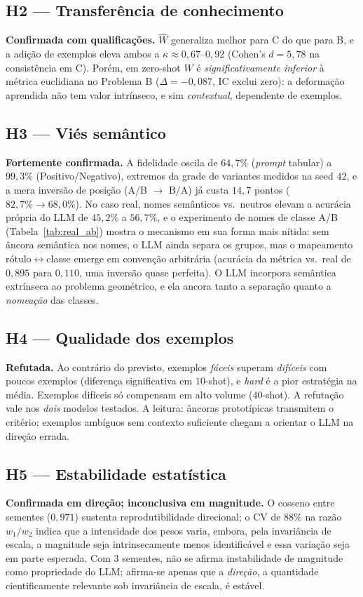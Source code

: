 \documentclass[12pt,a4paper]{article}
\newcommand{\West}{\ensuremath{\hat{W}}}   %
\begin{document}
\subsection{H2 — Transferência de conhecimento}
\textbf{Confirmada com qualificações.} \West{} generaliza melhor para C do que para B, e a
adição de exemplos eleva ambos a $\kappa \approx 0{,}67$–$0{,}92$ (Cohen's $d = 5{,}78$ na
consistência em C). Porém, em zero-shot \West{} é \emph{significativamente inferior} à
métrica euclidiana no Problema B ($\Delta = -0{,}087$, IC exclui zero): a deformação
aprendida não tem valor intrínseco, e sim \emph{contextual}, dependente de exemplos.

\subsection{H3 — Viés semântico}
\textbf{Fortemente confirmada.} A fidelidade oscila de $64{,}7\%$ (\emph{prompt} tabular) a
$99{,}3\%$ (Positivo/Negativo), extremos da grade de variantes medidos na seed $42$, e a
mera inversão de posição (A/B $\to$ B/A) já custa $14{,}7$ pontos ($82{,}7\% \to 68{,}0\%$).
No caso real, nomes semânticos vs.\ neutros elevam a acurácia própria do LLM de $45{,}2\%$ a
$56{,}7\%$, e o experimento de nomes de classe A/B (Tabela~\ref{tab:real_ab}) mostra o
mecanismo em sua forma mais nítida: sem âncora semântica nos nomes, o LLM ainda separa os
grupos, mas o mapeamento rótulo$\leftrightarrow$classe emerge em convenção arbitrária
(acurácia da métrica vs.\ real de $0{,}895$ para $0{,}110$, uma inversão quase perfeita).
O LLM incorpora semântica extrínseca ao problema geométrico, e ela ancora tanto a
separação quanto a \emph{nomeação} das classes.

\subsection{H4 — Qualidade dos exemplos}
\textbf{Refutada.} Ao contrário do previsto, exemplos \emph{fáceis} superam \emph{difíceis}
com poucos exemplos (diferença significativa em $10$-shot), e \emph{hard} é a pior
estratégia na média. Exemplos difíceis só compensam em alto volume ($40$-shot). A refutação
vale nos \emph{dois} modelos testados. A leitura: âncoras prototípicas transmitem o critério;
exemplos ambíguos sem contexto suficiente chegam a orientar o LLM na direção errada.

\subsection{H5 — Estabilidade estatística}
\textbf{Confirmada em direção; inconclusiva em magnitude.} O cosseno entre sementes
($0{,}971$) sustenta reprodutibilidade direcional; o CV de $88\%$ na razão $w_1/w_2$ indica
que a intensidade dos pesos varia, embora, pela invariância de escala, a magnitude seja
intrinsecamente menos identificável e essa variação seja em parte esperada. Com $3$ sementes,
não se afirma instabilidade de magnitude como propriedade do LLM; afirma-se apenas que a
\emph{direção}, a quantidade cientificamente relevante sob invariância de escala, é estável.
\end{document}
